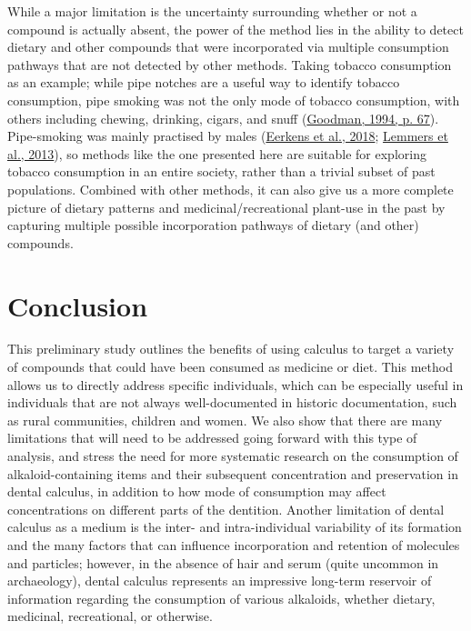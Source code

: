 \documentclass[
  letterpaper,
]{book}
\begin{document}
While a major limitation is the uncertainty surrounding whether or not a
compound is actually absent, the power of the method lies in the ability
to detect dietary and other compounds that were incorporated via
multiple consumption pathways that are not detected by other methods.
Taking tobacco consumption as an example; while pipe notches are a
useful way to identify tobacco consumption, pipe smoking was not the
only mode of tobacco consumption, with others including chewing,
drinking, cigars, and snuff
(\protect\hyperlink{ref-goodmanTobaccoHistory1994}{Goodman, 1994, p.
67}). Pipe-smoking was mainly practised by males
(\protect\hyperlink{ref-eerkensDentalCalculus2018}{Eerkens et al.,
2018}; \protect\hyperlink{ref-lemmersMiddenbeemster2013}{Lemmers et al.,
2013}), so methods like the one presented here are suitable for
exploring tobacco consumption in an entire society, rather than a
trivial subset of past populations. Combined with other methods, it can
also give us a more complete picture of dietary patterns and
medicinal/recreational plant-use in the past by capturing multiple
possible incorporation pathways of dietary (and other) compounds.

\hypertarget{conclusion-1}{%
\section{Conclusion}\label{conclusion-1}}

This preliminary study outlines the benefits of using calculus to target
a variety of compounds that could have been consumed as medicine or
diet. This method allows us to directly address specific individuals,
which can be especially useful in individuals that are not always
well-documented in historic documentation, such as rural communities,
children and women. We also show that there are many limitations that
will need to be addressed going forward with this type of analysis, and
stress the need for more systematic research on the consumption of
alkaloid-containing items and their subsequent concentration and
preservation in dental calculus, in addition to how mode of consumption
may affect concentrations on different parts of the dentition. Another
limitation of dental calculus as a medium is the inter- and
intra-individual variability of its formation and the many factors that
can influence incorporation and retention of molecules and particles;
however, in the absence of hair and serum (quite uncommon in
archaeology), dental calculus represents an impressive long-term
reservoir of information regarding the consumption of various alkaloids,
whether dietary, medicinal, recreational, or otherwise.
\end{document}
